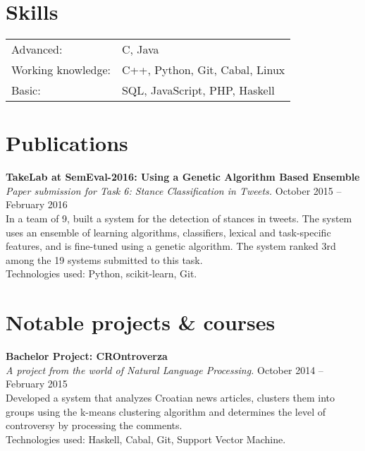 \documentclass[margin,line]{resume}
\begin{document}
\begin{resume}
\vspace{-3mm}
\section{\mysidestyle Skills}

\begin{tabular}{@{}ll@{}}
Advanced: & C, Java \\%
Working knowledge: & C++, Python, Git, Cabal, Linux \\%
Basic: & SQL, JavaScript, PHP, Haskell \\%
\end{tabular}

\vspace{1mm}
\section{\mysidestyle Publications}

\textbf{TakeLab at SemEval-2016: Using a Genetic Algorithm Based Ensemble} \vspace{2mm}\\\vspace{1mm}%
\textsl{Paper submission for Task 6: Stance Classification in Tweets.} \hfill October 2015 -- February 2016\\%
In a team of 9, built a system for the detection of stances in tweets. The system uses an ensemble of learning algorithms, classifiers, lexical and task-specific features, and is fine-tuned using a genetic algorithm. The system ranked 3rd among the 19 systems submitted to this task. \\
Technologies used: Python, scikit-learn, Git.

\vspace{1mm}
\section{\mysidestyle Notable projects \& courses}

\textbf{Bachelor Project: CROntroverza} \vspace{2mm}\\\vspace{1mm}%
\textsl{A project from the world of Natural Language Processing.} \hfill October 2014 -- February 2015\\%
Developed a system that analyzes Croatian news articles, clusters them into groups using the k-means clustering algorithm and determines the level of controversy by processing the comments. \\
Technologies used: Haskell, Cabal, Git, Support Vector Machine.


\end{resume}
\end{document}
